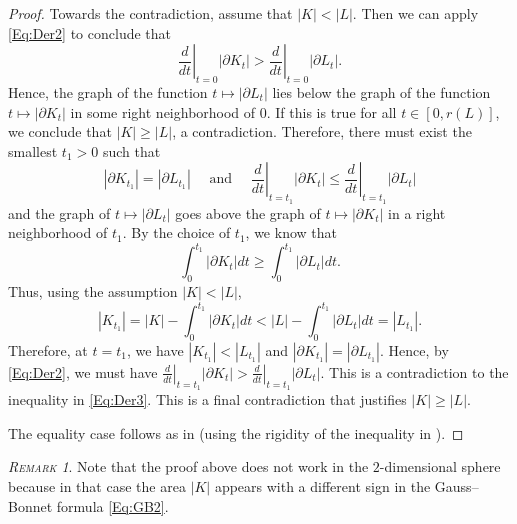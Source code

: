 \documentclass[12pt]{amsart}
\renewcommand{\ge}{\geqslant}
\renewcommand{\le}{\leqslant}
\theoremstyle{theorem}
\theoremstyle{Intro}
\theoremstyle{definition}
\theoremstyle{remark}
\newtheorem*{remark}{\textsc{Remark}}
\theoremstyle{claim}
\numberwithin{equation}{section}
\begin{document}
\begin{proof}
Towards the contradiction, assume that $|K| <|L|$. Then we can apply \eqref{Eq:Der2} to conclude that 
\[
\left.\frac{d}{dt}\right|_{t=0}|\partial K_t| >  \left.\frac{d}{dt}\right|_{t=0}|\partial L_t|.
\]
Hence, the graph of the function $t \mapsto |\partial L_t|$ lies below the graph of the function $t \mapsto |\partial K_t|$ in some right neighborhood of $0$. If this is true for all $t \in [0,r(L)]$, we conclude that $|K| \ge |L|$, a contradiction. Therefore, there must exist the smallest $t_1 > 0$ such that 
\begin{equation}
\label{Eq:Der3}    
|\partial K_{t_1}| = |\partial L_{t_1}| \quad \text{ and }\quad \left.\frac{d}{dt}\right|_{t=t_1}|\partial K_t| \le   \left.\frac{d}{dt}\right|_{t=t_1}|\partial L_t|
\end{equation}
and the graph of $t \mapsto |\partial L_t|$ goes above the graph of $t \mapsto |\partial K_t|$ in a right neighborhood of $t_1$. By the choice of $t_1$, we know that 
\[
\int_0^{t_1}|\partial K_t|dt \ge \int_0^{t_1}|\partial L_t|dt. 
\]
Thus, using the assumption $|K| < |L|$,
\[
|K_{t_1}| = |K| - \int_0^{t_1}|\partial K_t|dt < |L| - \int_0^{t_1}|\partial L_t|dt = |L_{t_1}|.
\]
Therefore, at $t = t_1$, we have $|K_{t_1}| < |L_{t_1}|$ and $|\partial K_{t_1}| = |\partial L_{t_1}|$. Hence, by \eqref{Eq:Der2}, we must have $\left.\frac{d}{dt}\right|_{t=t_1}|\partial K_t| >  \left.\frac{d}{dt}\right|_{t=t_1}|\partial L_t|$. This is a contradiction to the inequality in \eqref{Eq:Der3}. This is a final contradiction that justifies $|K| \ge |L|$.

The equality case follows as in \cite{DT} (using the rigidity of the inequality in \cite{Dr}).
\end{proof}

\begin{remark}
    Note that the proof above does not work in the $2$-dimensional sphere because in that case the area $|K|$ appears with a different sign in the Gauss--Bonnet formula \eqref{Eq:GB2}.
\end{remark}
\end{document}
